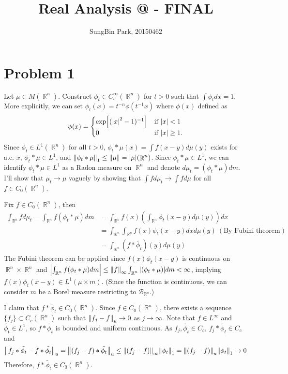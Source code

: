 \documentclass{article}
\makeatletter
\DeclareMathOperator{\rr}{\mathbb{R}}
\newcommand*{\rom}[1]{\expandafter\@slowromancap\romannumeral #1@}
\makeatother
\begin{document}
\title{Real Analysis \rom{2} - FINAL}
\author{SungBin Park, 20150462} 

\maketitle

\section*{Problem 1}
Let $\mu\in M(\rr^n)$. Construct $\phi_t\in C_c^\infty(\rr^n)$ for $t>0$ such that $\int \phi_t dx=1$. More explicitly, we can set $\phi_t(x)=t^{-n}\phi(t^{-1}x)$ where $\phi(x)$ defined as
\begin{equation*}
\phi(x)=\begin{cases}
\exp[(\abs{x}^2-1)^{-1}] & \text{if }\abs{x}<1 \\
0 & \text{if }\abs{x}\geq 1.
\end{cases}
\end{equation*}
Since $\phi_t\in L^1(\rr^n)$ for all $t>0$, $\phi_t*\mu(x)=\int f(x-y)d\mu(y)$ exists for a.e. $x$, $\phi_t*\mu\in L^1$, and $\norm{\phi_t * \mu}_1\leq \norm{\mu}=\abs{\mu}(\rr^n)$. Since $\phi_t*\mu\in L^1$, we can identify $\phi_t*\mu\in L^1$ as a Radon measure on $\rr^n$ and denote $d\mu_t=(\phi_t*\mu)dm$. I'll show that $\mu_t\rightarrow\mu$ vaguely by showing that $\int fd\mu_t\rightarrow\int fd\mu$ for all $f\in C_0(\rr^n)$.

Fix $f\in C_0(\rr^n)$, then
\begin{equation*}
\begin{split}
\int_{\rr^n} fd\mu_t = \int_{\rr^n} f (\phi_t*\mu)dm&=\int_{\rr^n} f(x) \left(\int_{\rr^n} \phi_t(x-y)d\mu(y)\right)dx \\
&=\int_{\rr^n}\int_{\rr^n} f(x)\phi_t(x-y)dxd\mu(y)~(\text{By Fubini theorem}) \\
&=\int_{\rr^n} (f*\tilde{\phi_t})(y)d\mu(y)
\end{split}
\end{equation*}
The Fubini theorem can be applied since $f(x)\phi_t(x-y)$ is continuous on $\rr^n\times \rr^n$ and $\abs{\int_{\rr^n} f (\phi_t*\mu)dm}\leq \norm{f}_\infty \int_{\rr^n}\abs{(\phi_t*\mu)}dm<\infty$, implying $f(x)\phi_t(x-y)\in L^1(\mu\times m)$. (Since the function is continuous, we can consider $m$ be a Borel measure restricting to $\mathcal{B}_{\rr^n}$.)

I claim that $f*\tilde{\phi_t}\in C_0(\rr^n)$. Since $f\in C_0(\rr^n)$, there exists a sequence $\{f_j\}\subset C_c(\rr^n)$ such that $\norm{f_j-f}_u\rightarrow 0$ as $j\rightarrow \infty$. Note that $f\in L^\infty$ and $\tilde{\phi_t}\in L^1$, so $f*\tilde{\phi_t}$ is bounded and uniform continuous. As $f_j,\tilde{\phi_t}\in C_c$, $f_j*\tilde{\phi_t}\in C_c$ and
\begin{equation*}
\norm{f_j*\tilde{\phi_t}-f*\tilde{\phi_t}}_u=\norm{(f_j-f)*\tilde{\phi_t}}_u\leq \norm{(f_j-f)}_\infty\norm{\phi_t}_1=\norm{(f_j-f)}_u\norm{\phi_t}_1\rightarrow 0
\end{equation*}
Therefore, $f*\tilde{\phi_t}\in C_0(\rr^n)$.
\end{document}
